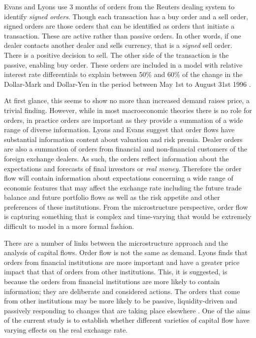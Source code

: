 \documentclass[12pt, a4paper, oneside]{article}\usepackage[]{graphicx}\usepackage[]{color}
\begin{document}
 Evans and Lyons use 3 months of orders from the Reuters dealing system to identify \emph{signed orders}.  Though each transaction has a buy order and a sell order, signed orders are those orders that can be identified as orders that initiate a transaction.  These are active rather than passive orders.  In other words, if one dealer contacts another dealer and sells currency, that is a \emph{signed} sell order. There is a positive decision to sell.  The other side of the transaction is the passive, enabling buy order.  These orders are included in a model with relative interest rate differentials to explain between 50\% and 60\% of the change in the Dollar-Mark and Dollar-Yen in the period between May 1st to August 31st 1996 \citep{Evans2002Order}.  

At first glance, this seems to show no more than increased demand raises price, a trivial finding.  However, while in most macroeconomic theories there is no role for orders, in practice orders are important as they provide a summation of a wide range of diverse information.   Lyons and Evans suggest that order flows have substantial information content about valuation and risk premia.  Dealer orders are also a summation of orders from financial and non-financial customers of the foreign exchange dealers.  As such, the orders reflect information about the expectations and forecasts of final investors or \emph{real money}.  Therefore the order flow will contain information about expectations concerning a wide range of economic features that may affect the exchange rate including the future trade balance and future portfolio flows as well as the risk appetite and other preferences of these institutions. From the microstructure perspective, order flow is capturing something that is complex and time-varying that would be extremely difficult to model in a more formal fashion.   

There are a number of links between the microstructure approach and the analysis of capital flows.  Order flow is not the same as demand.  Lyons finds that orders from financial institutions are more important and have a greater price impact that that of orders from other institutions. This, it is suggested, is because the orders from financial institutions are more likely to contain information; they are deliberate and considered actions.  The orders that come from other institutions may be more likely to be passive, liquidity-driven and passively responding to changes that are taking place elsewhere \citep[p.188] {Lyons1995Microstructure}.  One of the aims of the current study is to establish whether different varieties of capital flow have varying effects on the real exchange rate.   
\end{document}
